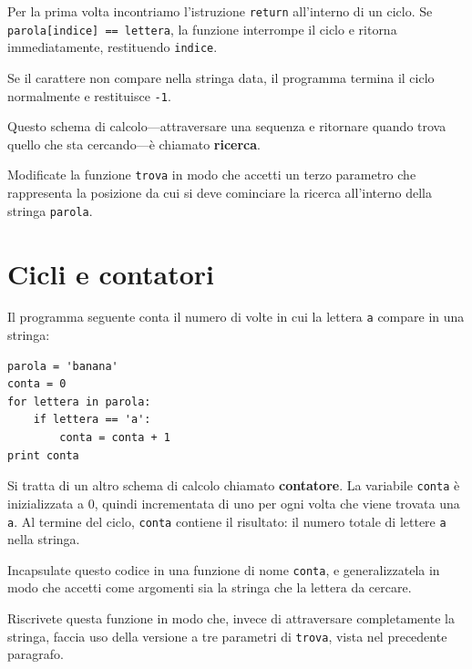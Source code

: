 \documentclass[10pt]{book}
\begin{document}
Per la prima volta incontriamo l'istruzione {\tt return} all'interno di un ciclo. Se {\tt parola[indice] == lettera}, la funzione interrompe il ciclo e ritorna immediatamente, restituendo {\tt indice}. 

Se il carattere non compare nella stringa data, il programma termina il ciclo  normalmente e restituisce {\tt -1}.

Questo schema di calcolo---attraversare una sequenza e ritornare quando trova quello che sta cercando---è chiamato {\bf ricerca}.

\vspace{0.2in}
\begin{exercise}

Modificate la funzione {\tt trova} in modo che accetti un terzo parametro che rappresenta la posizione da cui si deve cominciare la ricerca all'interno della stringa {\tt parola}.

\end{exercise}


\section{Cicli e contatori}
\label{counter}

Il programma seguente conta il numero di volte in cui la lettera {\tt a}
compare in una stringa:

\begin{verbatim}
parola = 'banana'
conta = 0
for lettera in parola:
    if lettera == 'a':
        conta = conta + 1
print conta
\end{verbatim}
%
Si tratta di un altro schema di calcolo chiamato  {\bf contatore}.  La variabile {\tt conta} è inizializzata a 0, quindi incrementata di uno per ogni volta che viene trovata una {\tt a}.
Al termine del ciclo, {\tt conta} contiene il risultato: il numero totale di lettere {\tt a} nella stringa.

\vspace{0.2in}
\begin{exercise}

Incapsulate questo codice in una funzione di nome {\tt conta}, e generalizzatela in modo che accetti come argomenti sia la stringa che la lettera da cercare.
\end{exercise}

\vspace{0.2in}
\begin{exercise}

Riscrivete questa funzione in modo che, invece di attraversare completamente la stringa, faccia uso della versione a tre parametri di {\tt trova}, vista nel precedente paragrafo.

\end{exercise}
\end{document}
